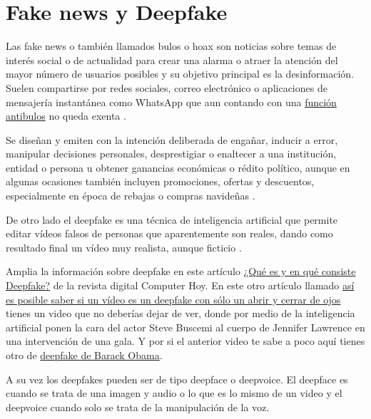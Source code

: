 \documentclass[
  a4paper,
  openany]{book}
\begin{document}
\hypertarget{fake-news-y-deepfake}{%
\section{Fake news y Deepfake}\label{fake-news-y-deepfake}}

Las fake news o también llamados bulos o hoax son noticias sobre temas de interés social o de actualidad para crear una alarma o atraer la atención del mayor número de usuarios posibles y su objetivo principal es la desinformación. Suelen compartirse por redes sociales, correo electrónico o aplicaciones de mensajería instantánea como WhatsApp que aun contando con una \href{https://www.osi.es/es/actualidad/blog/2020/04/27/whatsapp-y-su-funcion-antibulos-descubrela}{función antibulos} no queda exenta \citep{OSI-bulos-buenas-practicas}.

Se diseñan y emiten con la intención deliberada de engañar, inducir a error, manipular decisiones personales, desprestigiar o enaltecer a una institución, entidad o persona u obtener ganancias económicas o rédito político, aunque en algunas ocasiones también incluyen promociones, ofertas y descuentos, especialmente en época de rebajas o compras navideñas \citep{WIKI-fake-news}.

De otro lado el deepfake es una técnica de inteligencia artificial que permite editar vídeos falsos de personas que aparentemente son reales, dando como resultado final un vídeo muy realista, aunque ficticio \citep{WIKI-deepfake}.

Amplia la información sobre deepfake en este artículo \href{https://computerhoy.com/reportajes/tecnologia/consiste-deepfake-446355}{¿Qué es y en qué consiste Deepfake?} de la revista digital Computer Hoy. En este otro artículo llamado \href{https://www.xataka.com/inteligencia-artificial/posible-saber-video-deepfake-solo-abrir-cerrar-ojos-literalmente-quizas-eso-no-sea-suficiente}{así es posible saber si un vídeo es un deepfake con sólo un abrir y cerrar de ojos} tienes un video que no deberías dejar de ver, donde por medio de la inteligencia artificial ponen la cara del actor Steve Buscemi al cuerpo de Jennifer Lawrence en una intervención de una gala. Y por si el anterior video te sabe a poco aquí tienes otro de \href{https://www.youtube.com/watch?v=cQ54GDm1eL0}{deepfake de Barack Obama}.

A su vez los deepfakes pueden ser de tipo deepface o deepvoice. El deepface es cuando se trata de una imagen y audio o lo que es lo mismo de un video y el deepvoice cuando solo se trata de la manipulación de la voz.
\end{document}
